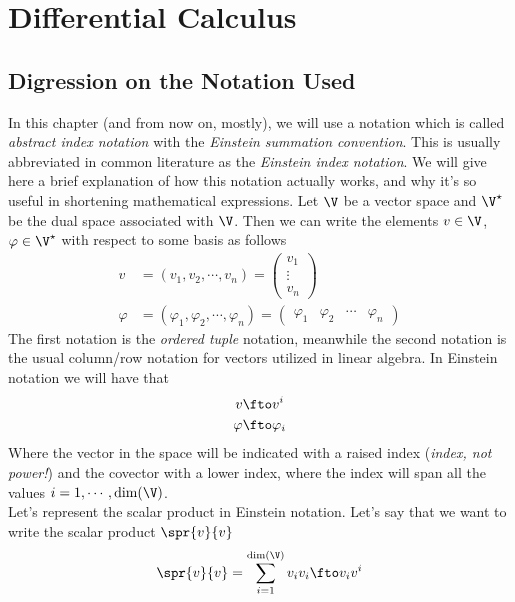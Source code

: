 \documentclass[../mmf.tex]{subfiles}
\begin{document}
\chapter{Differential Calculus}
\section{Digression on the Notation Used}
In this chapter (and from now on, mostly), we will use a notation which is called \textit{abstract index notation} with the \textit{Einstein summation convention}. This is usually abbreviated in common literature as the \textit{Einstein index notation}. We will give here a brief explanation of how this notation actually works, and why it's so useful in shortening mathematical expressions. Let $\V$ be a vector space and $\V^\star$ be the dual space associated with $\V$. Then we can write the elements $v\in\V$, $\varphi\in\V^\star$ with respect to some basis as follows
\begin{equation}
	\begin{aligned}
		v&=(v_1,v_2,\cdots,v_n)=\begin{pmatrix}v_1\\\vdots\\v_n\end{pmatrix}\\
		\varphi&=(\varphi_1,\varphi_2,\cdots,\varphi_n)=\begin{pmatrix}\varphi_1&\varphi_2&\cdots&\varphi_n\end{pmatrix}
	\end{aligned}
	\label{eq:contrcovvector}
\end{equation}
The first notation is the \textit{ordered tuple} notation, meanwhile the second notation is the usual column/row notation for vectors utilized in linear algebra. In Einstein notation we will have that
\begin{equation}
	\begin{aligned}
		v&\fto v^i\\
		\varphi&\fto \varphi_i
	\end{aligned}
	\label{eq:einsteinnot1}
\end{equation}
Where the vector in the space will be indicated with a raised index (\emph{index, not power!}) and the covector with a lower index, where the index will span all the values $i=1,\cdots,\dim(\V)$.\\
Let's represent the scalar product in Einstein notation. Let's say that we want to write the scalar product $\spr{v}{v}$
\begin{equation}
	\spr{v}{v}=\sum_{i=1}^{\dim(\V)}v_iv_i\fto v_iv^i
	\label{eq:spreinstein2}
\end{equation}
\end{document}
